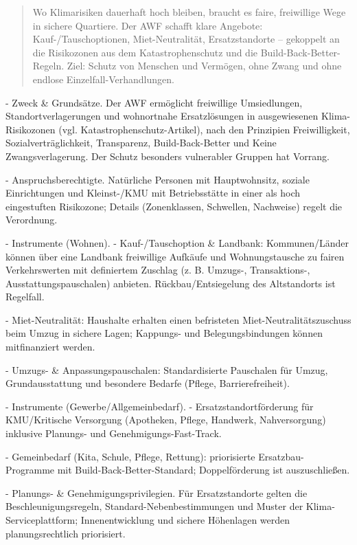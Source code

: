 \documentclass[12pt,a4paper]{scrartcl}
\begin{document}
\begin{quote}
Wo Klimarisiken dauerhaft hoch bleiben, braucht es faire, freiwillige Wege in sichere Quartiere. Der AWF schafft klare Angebote: Kauf-/Tauschoptionen, Miet-Neutralität, Ersatzstandorte -- gekoppelt an die Risikozonen aus dem Katastrophenschutz und die Build-Back-Better-Regeln. Ziel: Schutz von Menschen und Vermögen, ohne Zwang und ohne endlose Einzelfall-Verhandlungen.
\end{quote}

- Zweck \& Grundsätze. Der AWF ermöglicht freiwillige Umsiedlungen, Standortverlagerungen und wohnortnahe Ersatzlösungen in ausgewiesenen Klima-Risikozonen (vgl. Katastrophenschutz-Artikel), nach den Prinzipien Freiwilligkeit, Sozialverträglichkeit, Transparenz, Build-Back-Better und Keine Zwangsverlagerung. Der Schutz besonders vulnerabler Gruppen hat Vorrang.

- Anspruchsberechtigte. Natürliche Personen mit Hauptwohnsitz, soziale Einrichtungen und Kleinst-/KMU mit Betriebsstätte in einer als hoch eingestuften Risikozone; Details (Zonenklassen, Schwellen, Nachweise) regelt die Verordnung.

- Instrumente (Wohnen).
- Kauf-/Tauschoption \& Landbank: Kommunen/Länder können über eine Landbank freiwillige Aufkäufe und Wohnungstausche zu fairen Verkehrswerten mit definiertem Zuschlag (z. B. Umzugs-, Transaktions-, Ausstattungspauschalen) anbieten. Rückbau/Entsiegelung des Altstandorts ist Regelfall.

- Miet-Neutralität: Haushalte erhalten einen befristeten Miet-Neutralitätszuschuss beim Umzug in sichere Lagen; Kappungs- und Belegungsbindungen können mitfinanziert werden.

- Umzugs- \& Anpassungspauschalen: Standardisierte Pauschalen für Umzug, Grundausstattung und besondere Bedarfe (Pflege, Barrierefreiheit).

- Instrumente (Gewerbe/Allgemeinbedarf).
- Ersatzstandortförderung für KMU/Kritische Versorgung (Apotheken, Pflege, Handwerk, Nahversorgung) inklusive Planungs- und Genehmigungs-Fast-Track.

- Gemeinbedarf (Kita, Schule, Pflege, Rettung): priorisierte Ersatzbau-Programme mit Build-Back-Better-Standard; Doppelförderung ist auszuschließen.

- Planungs- \& Genehmigungsprivilegien. Für Ersatzstandorte gelten die Beschleunigungsregeln, Standard-Nebenbestimmungen und Muster der Klima-Serviceplattform; Innenentwicklung und sichere Höhenlagen werden planungsrechtlich priorisiert.
\end{document}
